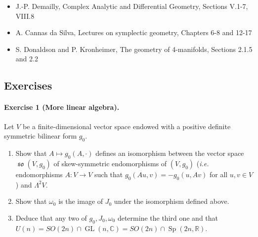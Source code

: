 \documentclass{article}
\theoremstyle{definition}
\DeclareMathOperator{\Sp}{Sp}
\DeclareMathOperator{\GL}{GL}
\DeclareMathOperator{\so}{\mathfrak{so}}
\newcommand{\R}{\mathbb{R}}
\newcommand{\C}{\mathbb{C}}
\begin{document}
\begin{itemize}
    \item J.-P. Demailly, Complex Analytic and Differential Geometry, Sections
        V.1-7, VIII.8

    \item A. Cannas da Silva, Lectures on symplectic geometry, Chapters 6-8 and
        12-17

    \item S. Donaldson and P. Kronheimer, The geometry of 4-manifolds, Sections
        2.1.5 and 2.2
\end{itemize}

\subsection*{Exercises}

\paragraph{Exercise 1 {\normalfont(More linear algebra)}.} Let $V$ be a
finite-dimensional vector space endowed with a positive definite symmetric
bilinear form $g_0$.
\begin{enumerate}[label=(\roman*)]
    \item Show that $A\mapsto g_0(A,\cdot)$ defines an isomorphism between the
        vector space $\so(V,g_0)$ of skew-symmetric endomorphisms of $(V,g_0)$
        (\emph{i.e.} endomorphisms $A:V\to V$ such that $g_0(Au,v)=-g_0(u,Av)$
        for all $u,v\in V$) and $\Lambda^2V$.

    \item Show that $\omega_0$ is the image of $J_0$ under the isomorphism
        defined above.

    \item Deduce that any two of $g_0,J_0,\omega_0$ determine the third one and
        that $U(n)=SO(2n)\cap\GL(n,\C)=SO(2n)\cap\Sp(2n,\R)$.
\end{enumerate}
\end{document}
